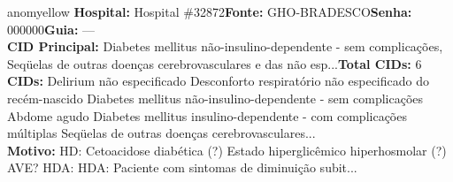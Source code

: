 \documentclass[a4paper,10pt]{article}
\begin{document}
\begin{anomalycard}[Interna\c{c}\~{a}o \#119370 | Pac. \#98998 | MODERADO (z=2.11) | LOS: 4d | 27/02/2026\,$\to$\,03/03/2026]{anomyellow}
\textbf{Hospital:} Hospital \#32872\quad \textbf{Fonte:} GHO-BRADESCO\quad \textbf{Senha:} 000000\quad \textbf{Guia:} ---\\

\textbf{CID Principal:} {\small Diabetes mellitus não-insulino-dependente - sem complicações, Seqüelas de outras doenças cerebrovasculares e das não esp...}\quad\textbf{Total CIDs:} 6\\

\textbf{CIDs:} {\scriptsize Delirium não especificado \textbar{} Desconforto respiratório não especificado do recém-nascido \textbar{} Diabetes mellitus não-insulino-dependente - sem complicações \textbar{} Abdome agudo \textbar{} Diabetes mellitus insulino-dependente - com complicações múltiplas \textbar{} Seqüelas de outras doenças cerebrovasculares...}\\

\textbf{Motivo:} {\scriptsize HD: Cetoacidose diabética (?) Estado hiperglicêmico hiperhosmolar (?) AVE? HDA: HDA: Paciente com sintomas de diminuição subit...}\\




\end{anomalycard}
\end{document}
